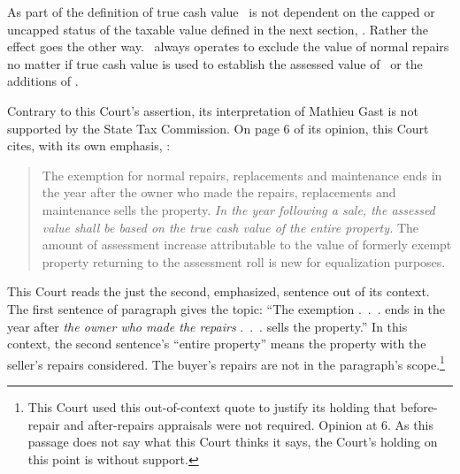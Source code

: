\documentclass[12pt,\documentclassflag]{michiganCourtOfAppealsBrief}
\begin{document}

As part of the definition of true cash value \mathieuGast\ is not dependent on the capped or uncapped status of the taxable value defined in the next section, \cite{MCL 211.27a}. Rather the effect goes the other way. \mathieuGast\ always
operates to exclude the value of normal repairs no matter if true cash value is used to establish the assessed value of \cite{MCL 211.27a(1)}\ or the additions of \cite{MCL 211.27a(2)(b)}.

Contrary to this Court's assertion, its interpretation of Mathieu Gast is not supported by the State Tax Commission. On page 6 of its opinion, this Court cites, with its own emphasis, :

\begin{quote}
The exemption for normal repairs, replacements and maintenance ends in the year after the
owner who made the repairs, replacements and maintenance sells the property. \emph{In the year
following a sale, the assessed value shall be based on the true cash value of the entire property.}
The amount of assessment increase attributable to the value of formerly exempt property
returning to the assessment roll is new for equalization purposes.
\end{quote}

This Court reads the just the second, emphasized, sentence out of its context. The first sentence of paragraph gives the topic: ``The exemption .~.~. ends in the year after \emph{the owner who made the repairs} .~.~. sells the property.'' In this context, the second sentence's ``entire property'' means the property with the seller's repairs considered. The buyer's repairs are not in the paragraph's scope.\footnote{This Court used this out-of-context quote to justify its holding that before-repair and after-repairs appraisals were not required. Opinion at 6. As this passage does not say what this Court thinks it says, the Court's holding on this point is without support.}
\end{document}
